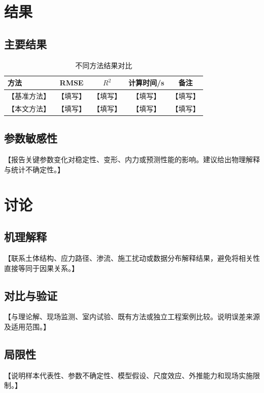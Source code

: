 \documentclass[UTF8,zihao=-5,twoside]{ctexart}
\numberwithin{equation}{section}
\newcommand{\placeholder}[1]{\textcolor{paperblack}{【#1】}}
\begin{document}
\section{结果}

\subsection{主要结果}
\begin{table}[H]
  \centering
  \caption{不同方法结果对比}
  \label{tab:model-results}
  \begin{tabular}{lcccc}
    \toprule
    方法 & RMSE & $R^2$ & 计算时间/s & 备注 \\
    \midrule
    \placeholder{基准方法} & \placeholder{填写} & \placeholder{填写} & \placeholder{填写} & \placeholder{填写} \\
    \placeholder{本文方法} & \placeholder{填写} & \placeholder{填写} & \placeholder{填写} & \placeholder{填写} \\
    \bottomrule
  \end{tabular}
\end{table}

\subsection{参数敏感性}
\placeholder{报告关键参数变化对稳定性、变形、内力或预测性能的影响。建议给出物理解释与统计不确定性。}

\section{讨论}

\subsection{机理解释}
\placeholder{联系土体结构、应力路径、渗流、施工扰动或数据分布解释结果，避免将相关性直接等同于因果关系。}

\subsection{对比与验证}
\placeholder{与理论解、现场监测、室内试验、既有方法或独立工程案例比较。说明误差来源及适用范围。}

\subsection{局限性}
\placeholder{说明样本代表性、参数不确定性、模型假设、尺度效应、外推能力和现场实施限制。}
\end{document}
